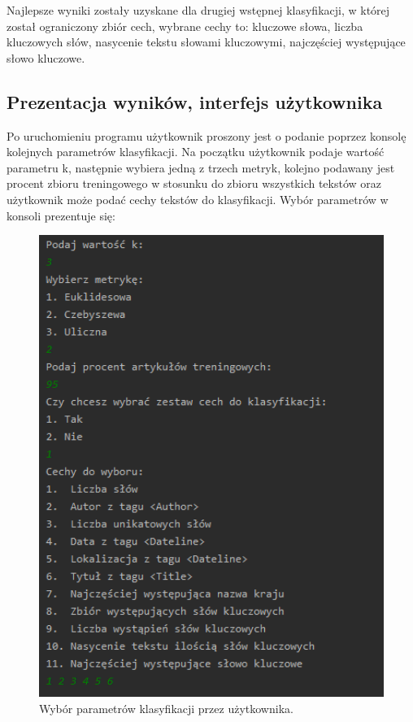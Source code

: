 \documentclass{classrep}
\begin{document}
Najlepsze wyniki zostały uzyskane dla drugiej wstępnej klasyfikacji, w której został ograniczony zbiór cech, wybrane cechy to: kluczowe słowa, liczba kluczowych słów, nasycenie tekstu słowami kluczowymi, najczęściej występujące słowo kluczowe. 


\subsection{Prezentacja wyników, interfejs użytkownika} 

Po uruchomieniu programu użytkownik proszony jest o podanie poprzez konsolę kolejnych parametrów klasyfikacji. Na początku użytkownik podaje wartość parametru k, następnie wybiera jedną z trzech metryk, kolejno podawany jest procent zbioru treningowego w stosunku do zbioru wszystkich tekstów oraz użytkownik może podać cechy tekstów do klasyfikacji. Wybór parametrów w konsoli prezentuje się:

\begin{figure}[h!]
 \centering
 \includegraphics[width=14cm]{Wybor.png}
 \vspace{-0.3cm}
 \caption{Wybór parametrów klasyfikacji przez użytkownika. }
 \label{Wybór parametrów klasyfikacji przez użytkownika. }
\end{figure}
\end{document}
